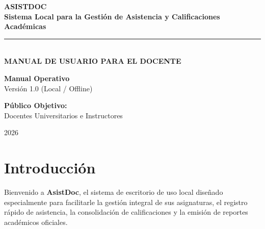 \documentclass[12pt,a4paper]{article}
\begin{document}
\begin{titlepage}
    \centering
    \vspace*{1.5cm}

    {\Huge \bfseries \color{primarycolor} ASISTDOC} \\[0.5cm]
    {\Large \bfseries Sistema Local para la Gestión de Asistencia y Calificaciones Académicas} \\[1.5cm]

    \rule{\linewidth}{0.5mm} \\[1cm]

    {\huge \bfseries MANUAL DE USUARIO PARA EL DOCENTE} \\[2cm]

    \begin{minipage}{0.48\textwidth}
        \begin{flushleft} \large
            \textbf{Manual Operativo} \\[0.2cm]
            Versión 1.0 (Local / Offline)
        \end{flushleft}
    \end{minipage}
    \begin{minipage}{0.48\textwidth}
        \begin{flushright} \large
            \textbf{Público Objetivo:} \\[0.2cm]
            Docentes Universitarios e Instructores
        \end{flushright}
    \end{minipage}

    \vfill

    {\large 2026}
\end{titlepage}

\tableofcontents
\newpage

\section{Introducción}
Bienvenido a \textbf{AsistDoc}, el sistema de escritorio de uso local diseñado especialmente para facilitarle la gestión integral de sus asignaturas, el registro rápido de asistencia, la consolidación de calificaciones y la emisión de reportes académicos oficiales.
\end{document}
